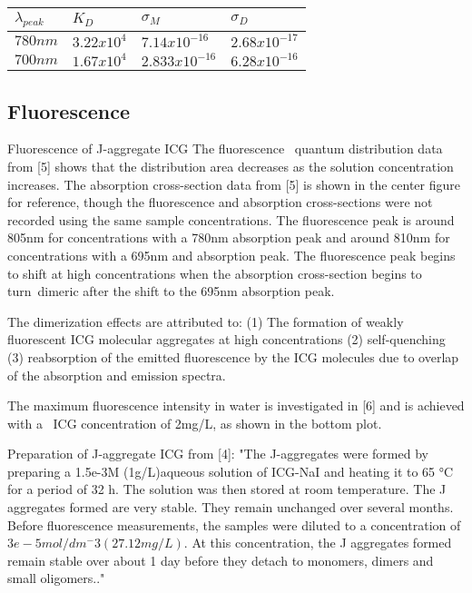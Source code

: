 \begin{tabularx}{0.8\textwidth} { 
	| >{\centering\arraybackslash}X 
	| >{\centering\arraybackslash}X 
	| >{\centering\arraybackslash}X 
	| >{\centering\arraybackslash}X | }
	\hline
	$\lambda_{peak}$ & $K_D$ & $\sigma_M$ & $\sigma_D$\\
	\hline
	$780nm$ & $3.22x10^4$ & $7.14x10^{-16}$ & $2.68x10^{-17}$\\
	\hline
	$700nm$ & $1.67x10^4$ & $2.833x10^{-16}$ & $6.28x10^{-16}$\\
	\hline
\end{tabularx}


\subsection{ Fluorescence}
Fluorescence of J-aggregate ICG
The fluorescence  quantum distribution data from [5] shows that the distribution area decreases as the solution concentration increases. The absorption cross-section data from [5] is shown in the center figure for reference, though the fluorescence and absorption cross-sections were not recorded using the same sample concentrations. The fluorescence peak is around 805nm for concentrations with a 780nm absorption peak and around 810nm for concentrations with a 695nm and absorption peak. The fluorescence peak begins to shift at high concentrations when the absorption cross-section begins to turn dimeric after the shift to the 695nm absorption peak.  

The dimerization effects are attributed to:
(1) The formation of weakly fluorescent ICG molecular aggregates at high concentrations
(2) self-quenching
(3) reabsorption of the emitted fluorescence by the ICG molecules due to overlap of the absorption and emission spectra.

The maximum fluorescence intensity in water is investigated in [6] and is achieved with a  ICG concentration of 2mg/L, as shown in the bottom plot. 

Preparation of J-aggregate ICG from [4]:
"The J-aggregates were formed by preparing a 1.5e-3M (1g/L)aqueous solution of ICG-NaI and heating it to 65 °C for a period of 32 h. The solution was then stored at room temperature. The J aggregates formed are very stable. They remain unchanged over several months. Before fluorescence measurements, the samples were diluted to a concentration of $3e-5mol/dm^-3 (27.12mg/L)$. At this concentration, the J aggregates formed remain stable over about 1 day before they detach to monomers, dimers and small oligomers.."

